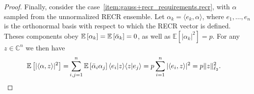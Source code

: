 \begin{proof}
  Finally, consider the case~\ref{item:gauss+recr_requirements.recr}, with $\alpha$ sampled from the unnormalized RECR ensemble.
  Let $\alpha_k = \langle  e_k, \alpha\rangle$, where $ e_1,\ldots, e_n$ is the orthonormal basis with respect to which the RECR vector is defined.
  Theses components obey $\mathbb{E}\left[ \alpha_k \right] = \mathbb{E} \left[ \bar{\alpha}_k \right] = 0$, as well as $\mathbb{E} \left[ |\alpha_k|^2 \right] = p$.
  For any $ z \in \mathbb{C}^n$ we then have
  \begin{align}
    \mathbb{E} \left[| \langle  \alpha,  z\rangle |^2 \right]
    =& \sum_{i,j=1}^n \mathbb{E} \left[ \bar{\alpha}_i \alpha_j \right] \langle  e_i |  z \rangle \langle  z |  e_j \rangle = p \sum_{i=1}^n | \langle  e_i,  z \rangle|^2 = p \|  z \|_{\ell_2}^2.
  \end{align}


\end{proof}
